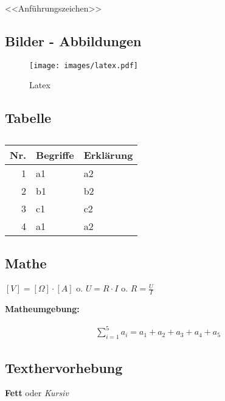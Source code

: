 <<Anführungszeichen>> 

\subsection{Bilder - Abbildungen}\label{bilder---abbildungen}

\begin{figure}[hb]%
\centering
\texttt{[image: images/latex.pdf]}
\caption{Latex}
\end{figure}

\subsection{Tabelle}\label{tabelle}

\begin{table}[ht]%
\centering
\begin{tabular}{rll
}%
\toprule
\textbf{Nr.} & \textbf{Begriffe} & \textbf{Erklärung} \\
\midrule
1 & a1 & a2 \\
2 & b1 & b2 \\
3 & c1 & c2 \\
4 & a1 & a2 \\
\bottomrule
\end{tabular}
\caption{}%
\end{table}

\subsection{Mathe}\label{mathe}

$[ V ] = [ \Omega ] \cdot [ A ]$ o. $U = R \cdot I$ o.
$R = \frac{U}{I}$

\textbf{Matheumgebung:}

\begin{align*}
    \sum_{i=1}^5 a_i = a_1 + a_2 + a_3 + a_4 + a_5
\end{align*}

\subsection{Texthervorhebung}\label{texthervorhebung}

\textbf{Fett} oder \emph{Kursiv}

